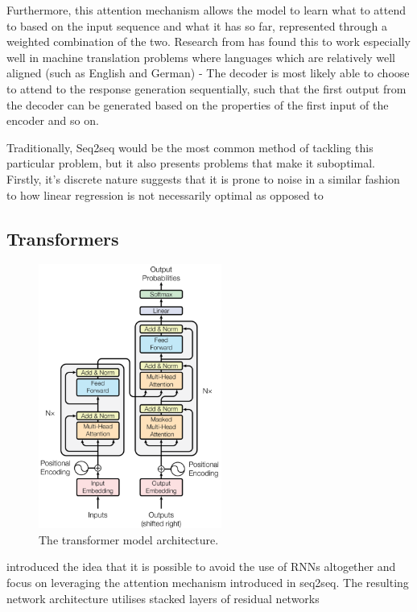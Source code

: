 \documentclass[12pt,twoside]{report}
\begin{document}
Furthermore, this attention mechanism allows the model to learn what to attend to based on the input sequence and what it has so far, represented through a weighted combination of the two. Research from \cite{bahdanau_neural_2014} has found this to work especially well in machine translation problems where languages which are relatively well aligned (such as English and German) - The decoder is most likely able to choose to attend to the response generation sequentially, such that the first output from the decoder can be generated based on the properties of the first input of the encoder and so on.

Traditionally, Seq2seq would be the most common method of tackling this particular problem, but it also presents problems that make it suboptimal. Firstly, it's discrete nature suggests that it is prone to noise in a similar fashion to how linear regression is not necessarily optimal as opposed to 

\subsection{Transformers}

\begin{figure}[!ht]
      
	\centering
	\includegraphics[width=60mm]{diagrams/transformers.png}
	\caption{The transformer model architecture.\cite{vaswani_attention_2017} \label{transformer}}
  \end{figure}

\cite{vaswani_attention_2017} introduced the idea that it is possible to avoid the use of RNNs altogether and focus on leveraging the attention mechanism introduced in seq2seq. The resulting network architecture utilises stacked layers of residual networks 
\end{document}
